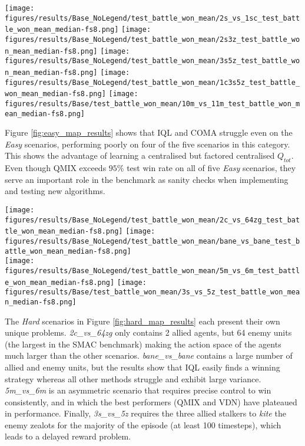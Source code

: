 \documentclass[twoside,11pt]{article}
\begin{document}
\begin{figure*}[h!]
	\centering
	\texttt{[image: figures/results/Base\_NoLegend/test\_battle\_won\_mean/2s\_vs\_1sc\_test\_battle\_won\_mean\_median-fs8.png]}
	\texttt{[image: figures/results/Base\_NoLegend/test\_battle\_won\_mean/2s3z\_test\_battle\_won\_mean\_median-fs8.png]}
	\texttt{[image: figures/results/Base\_NoLegend/test\_battle\_won\_mean/3s5z\_test\_battle\_won\_mean\_median-fs8.png]}
	\texttt{[image: figures/results/Base\_NoLegend/test\_battle\_won\_mean/1c3s5z\_test\_battle\_won\_mean\_median-fs8.png]}
	\texttt{[image: figures/results/Base/test\_battle\_won\_mean/10m\_vs\_11m\_test\_battle\_won\_mean\_median-fs8.png]}
	\caption{Easy scenarios. The heuristic AI's performance shown as a dotted black line. 
	}
	\label{fig:easy_map_results}
\end{figure*}


Figure \ref{fig:easy_map_results} shows that IQL and COMA struggle even on the \emph{Easy} scenarios, performing poorly on four of the five scenarios in this category. This shows the advantage of learning a centralised but factored centralised $Q_{tot}$. 
Even though QMIX exceeds $95\%$ test win rate on all of five \emph{Easy} scenarios, they serve an important role in the benchmark as sanity checks when implementing and testing new algorithms. 

\begin{figure*}[h!]
	\centering
	\texttt{[image: figures/results/Base\_NoLegend/test\_battle\_won\_mean/2c\_vs\_64zg\_test\_battle\_won\_mean\_median-fs8.png]}
	\texttt{[image: figures/results/Base\_NoLegend/test\_battle\_won\_mean/bane\_vs\_bane\_test\_battle\_won\_mean\_median-fs8.png]}
	\\
	\texttt{[image: figures/results/Base\_NoLegend/test\_battle\_won\_mean/5m\_vs\_6m\_test\_battle\_won\_mean\_median-fs8.png]}
	\texttt{[image: figures/results/Base/test\_battle\_won\_mean/3s\_vs\_5z\_test\_battle\_won\_mean\_median-fs8.png]}
	\caption{Hard scenarios. The heuristic AI's performance shown as a dotted black line.}
	\label{fig:hard_map_results}
\end{figure*}

The \textit{Hard} scenarios in Figure \ref{fig:hard_map_results} each present their own unique problems.
\textit{2c\_vs\_64zg} only contains 2 allied agents, but 64 enemy units (the largest in the SMAC benchmark) making the action space of the agents much larger than the other scenarios.
\textit{bane\_vs\_bane} contains a large number of allied and enemy units, but the results show that IQL easily finds a winning strategy whereas all other methods struggle and exhibit large variance.
\textit{5m\_vs\_6m} is an asymmetric scenario that requires precise control to win consistently, and in which the best performers (QMIX and VDN) have plateaued in performance.
Finally, \textit{3s\_vs\_5z} requires the three allied stalkers to \textit{kite} the enemy zealots for the majority of the episode (at least 100 timesteps), which leads to a delayed reward problem.
\end{document}

